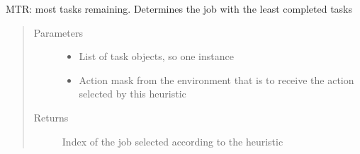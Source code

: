 \documentclass[letterpaper,10pt,english]{sphinxmanual}
\begin{document}
\begin{fulllineitems}
\label{\detokenize{agents.heuristic:agents.heuristic.heuristic_agent.mtr}}
\sphinxAtStartPar
MTR: most tasks remaining. Determines the job with the least completed tasks
\begin{quote}\begin{description}
\item[{Parameters}] \leavevmode\begin{itemize}
\item {} 
\sphinxAtStartPar
{} \textendash{} List of task objects, so one instance

\item {} 
\sphinxAtStartPar
{} \textendash{} Action mask from the environment that is to receive the action selected by this heuristic

\end{itemize}

\item[{Returns}] \leavevmode
\sphinxAtStartPar
Index of the job selected according to the heuristic

\end{description}\end{quote}

\end{fulllineitems}

\end{document}
